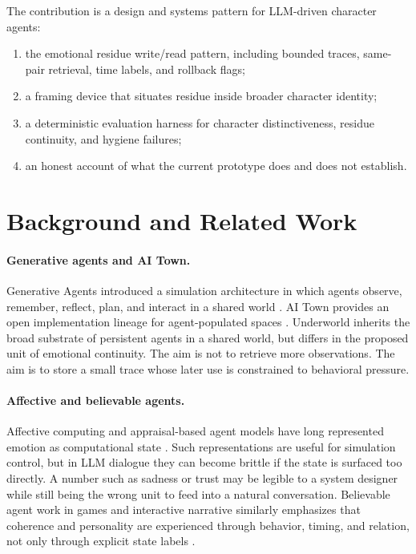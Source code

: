 \documentclass[11pt]{article}
\begin{document}
The contribution is a design and systems pattern for LLM-driven character agents:
\begin{enumerate}
  \item the emotional residue write/read pattern, including bounded traces, same-pair retrieval, time labels, and rollback flags;
  \item a framing device that situates residue inside broader character identity;
  \item a deterministic evaluation harness for character distinctiveness, residue continuity, and hygiene failures;
  \item an honest account of what the current prototype does and does not establish.
\end{enumerate}

\section{Background and Related Work}

\paragraph{Generative agents and AI Town.}
Generative Agents introduced a simulation architecture in which agents observe, remember, reflect, plan, and interact in a shared world \cite{park2023generative}. AI Town provides an open implementation lineage for agent-populated spaces \cite{aitown}. Underworld inherits the broad substrate of persistent agents in a shared world, but differs in the proposed unit of emotional continuity. The aim is not to retrieve more observations. The aim is to store a small trace whose later use is constrained to behavioral pressure.

\paragraph{Affective and believable agents.}
Affective computing and appraisal-based agent models have long represented emotion as computational state \cite{picard1997affective,ortony1988cognitive,mehrabian1974approach}. Such representations are useful for simulation control, but in LLM dialogue they can become brittle if the state is surfaced too directly. A number such as sadness or trust may be legible to a system designer while still being the wrong unit to feed into a natural conversation. Believable agent work in games and interactive narrative similarly emphasizes that coherence and personality are experienced through behavior, timing, and relation, not only through explicit state labels \cite{bates1994role}.
\end{document}
